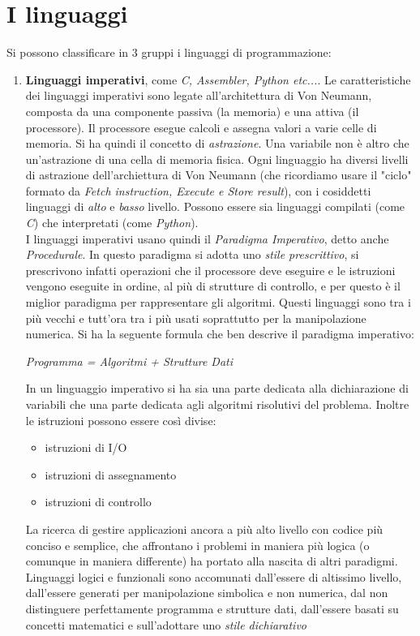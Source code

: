 \documentclass[a4paper,12pt, oneside]{book}
\begin{document}
\chapter{I linguaggi}
Si possono classificare in 3 gruppi i linguaggi di programmazione:
\begin{enumerate}
	\item \textbf{Linguaggi imperativi}, come \textit{C, Assembler, Python etc...}. Le caratteristiche dei linguaggi imperativi sono legate all'architettura di Von Neumann, composta da una componente passiva (la memoria) e una attiva (il processore). Il processore esegue calcoli e assegna valori a varie celle di memoria. Si ha quindi il concetto di \textit{astrazione}. Una variabile non è altro che un'astrazione di una cella di memoria fisica. Ogni linguaggio ha diversi livelli di astrazione dell'archiettura di Von Neumann (che ricordiamo usare il "ciclo" formato da \textit{Fetch instruction, Execute e Store result}), con i cosiddetti linguaggi di \textit{alto} e \textit{basso} livello. Possono essere sia linguaggi compilati (come \textit{C}) che interpretati (come \textit{Python}).\\
	      I linguaggi imperativi usano quindi il \textit{Paradigma Imperativo}, detto anche \textit{Procedurale}. In questo paradigma si adotta uno \textit{stile prescrittivo}, si prescrivono infatti operazioni che il processore deve eseguire e le istruzioni vengono eseguite in ordine, al più di strutture di controllo, e per questo è il miglior paradigma per rappresentare gli algoritmi. Questi linguaggi sono tra i più vecchi e tutt'ora tra i più usati soprattutto per la manipolazione numerica. Si ha la seguente formula che ben descrive il paradigma imperativo:
	      \begin{center}
		      \textit{Programma = Algoritmi + Strutture Dati}
	      \end{center}
	      In un linguaggio imperativo si ha sia una parte dedicata alla dichiarazione di variabili che una parte dedicata agli algoritmi risolutivi del problema. Inoltre le istruzioni possono essere così divise:
	      \begin{itemize}
		      \item istruzioni di I/O
		      \item istruzioni di assegnamento
		      \item istruzioni di controllo
	      \end{itemize}
	      La ricerca di gestire applicazioni ancora a più alto livello con codice più conciso e semplice, che affrontano i problemi in maniera più logica (o comunque in maniera differente) ha portato alla nascita di altri paradigmi. Linguaggi logici e funzionali sono accomunati dall'essere di altissimo livello, dall'essere generati per manipolazione simbolica e non numerica, dal non distinguere perfettamente programma e strutture dati, dall'essere basati su concetti matematici e sull'adottare uno \textit{stile dichiarativo}

\end{enumerate}
\end{document}
